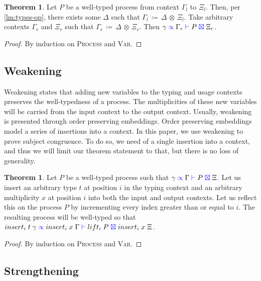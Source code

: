\documentclass[a4paper,UKenglish,cleveref, autoref, thm-restate,authorcolumns]{lipics-v2019}
\theoremstyle{definition}
\newtheorem{nitheorem}[theorem]{Theorem}
\newcommand{\type}[1]{\textcolor{blue}{\operatorname{#1}}}
\newcommand{\opctx}[3]{#1 \, \coloneqq \, #2 \, \otimes \, #3}
\newcommand{\types}[4]{#1 \; \type{\propto} \; #2 \; \type{\vdash} \; #3 \; \type{\boxtimes} \; #4}
\begin{document}
\begin{nitheorem}
  \label{thm:framing}
  Let $P$ be a well-typed process from context $\Gamma_l$ to $\Xi_l$.
  Then, per \autoref{lm:types-op}, there exists some $\Delta$ such that $\opctx{\Gamma_l}{\Delta}{\Xi_l}$.
  Take arbitrary contexts $\Gamma_r$ and $\Xi_r$ such that $\opctx{\Gamma_r}{\Delta}{\Xi_r}$.
  Then $\types{\gamma}{\Gamma_r}{P}{\Xi_r}$.
\end{nitheorem}
\begin{proof}
  By induction on \textsc{Process} and \textsc{Var}.
\end{proof}

\subsection{Weakening}
\label{weakening}

Weakening states that adding new variables to the typing and usage contexts preserves the well-typedness of a process.
The multiplicities of these new variables will be carried from the input context to the output context.
Usually, weakening is presented through order preserving embeddings.
Order preserving embeddings model a series of insertions into a context.
In this paper, we use weakening to prove subject congruence.
To do so, we need of a single insertion into a context, and thus we will limit our theorem statement to that, but there is no loss of generality.

\begin{nitheorem}
  \label{thm:weakening}
  Let $P$ be a well-typed process such that $\types{\gamma}{\Gamma}{P}{\Xi}$.
  Let us insert an arbitrary type $t$ at position $i$ in the typing context and an arbitrary multiplicity $x$ at position $i$ into both the input and output contexts.
  Let us reflect this on the process $P$ by incrementing every index greater than or equal to $i$.
  The resulting process will be well-typed so that $\types{insert_i \; t \; \gamma}{insert_i \; x \; \Gamma}{lift_i \; P}{insert_i \; x \; \Xi}$.
\end{nitheorem}
\begin{proof}
  By induction on \textsc{Process} and \textsc{Var}.
\end{proof}

\subsection{Strengthening}
\label{strengthening}
\end{document}
